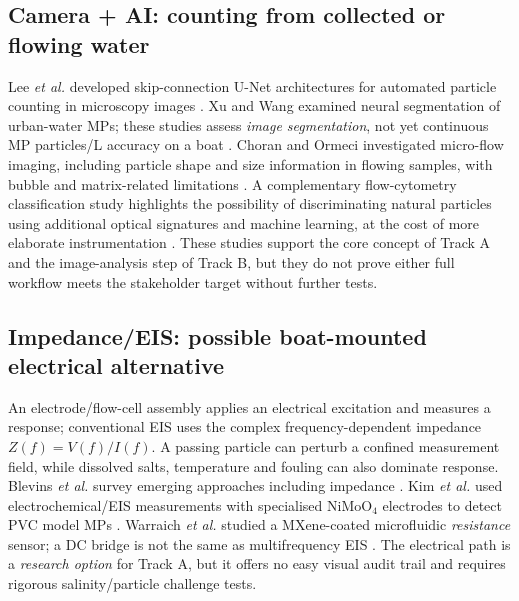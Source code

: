 \documentclass[10pt,a4paper]{article}
\begin{document}
\subsection{Camera + AI: counting from collected or flowing water}
Lee \emph{et al.} developed skip-connection U-Net architectures for automated particle counting in microscopy images \cite{Lee2022}. Xu and Wang examined neural segmentation of urban-water MPs; these studies assess \emph{image segmentation}, not yet continuous MP particles/L accuracy on a boat \cite{UrbanCNN2024}. Choran and Ormeci investigated micro-flow imaging, including particle shape and size information in flowing samples, with bubble and matrix-related limitations \cite{Microflow2023}. A complementary flow-cytometry classification study highlights the possibility of discriminating natural particles using additional optical signatures and machine learning, at the cost of more elaborate instrumentation \cite{Wang2024}. These studies support the core concept of Track A and the image-analysis step of Track B, but they do not prove either full workflow meets the stakeholder target without further tests.

\subsection{Impedance/EIS: possible boat-mounted electrical alternative}
An electrode/flow-cell assembly applies an electrical excitation and measures a response; conventional EIS uses the complex frequency-dependent impedance $Z(f)=V(f)/I(f)$. A passing particle can perturb a confined measurement field, while dissolved salts, temperature and fouling can also dominate response. Blevins \emph{et al.} survey emerging approaches including impedance \cite{Blevins2021}. Kim \emph{et al.} used electrochemical/EIS measurements with specialised NiMoO$_4$ electrodes to detect PVC model MPs \cite{Kim2024}. Warraich \emph{et al.} studied a MXene-coated microfluidic \emph{resistance} sensor; a DC bridge is not the same as multifrequency EIS \cite{Warraich2025}. The electrical path is a \emph{research option} for Track A, but it offers no easy visual audit trail and requires rigorous salinity/particle challenge tests.
\end{document}

